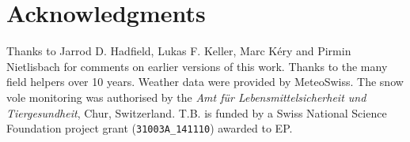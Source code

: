 \section*{Acknowledgments}
Thanks to Jarrod D. Hadfield, Lukas F. Keller, Marc K\'{e}ry and Pirmin Nietlisbach for comments on earlier versions of this work. Thanks to the many field helpers over 10 years. Weather data were provided by MeteoSwiss. The snow vole monitoring was authorised by the \textit{Amt f\"{u}r Lebensmittelsicherheit und Tiergesundheit}, Chur, Switzerland. T.B. is funded by a Swiss National Science Foundation project grant (\verb|31003A_141110|) awarded to EP. 

